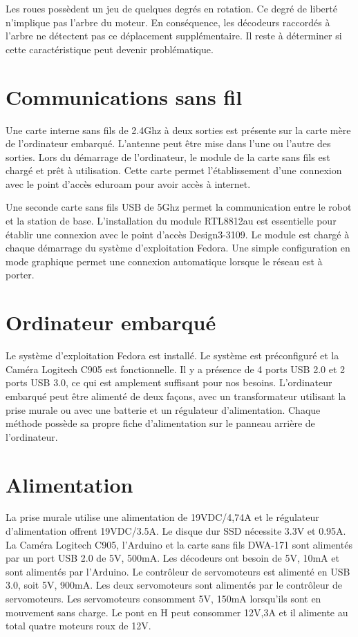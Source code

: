 Les roues possèdent un jeu de quelques degrés en rotation. Ce degré de liberté n’implique pas l’arbre du moteur. En conséquence, les décodeurs raccordés à l’arbre ne détectent pas ce déplacement supplémentaire. Il reste à déterminer si cette caractéristique peut devenir problématique. 


\section{Communications sans fil}
 Une carte interne sans fils de 2.4Ghz à deux sorties est présente sur la carte mère de l’ordinateur embarqué. L’antenne peut être mise dans l’une ou l’autre des sorties. Lors du démarrage de l’ordinateur, le module de la carte sans fils est chargé et prêt à utilisation. Cette carte permet l’établissement d’une connexion avec le point d’accès eduroam pour avoir accès à internet. 
 
 Une seconde carte sans fils USB de 5Ghz permet la communication entre le robot et la station de base. L’installation du module RTL8812au est essentielle pour établir une connexion avec le point d’accès Design3-3109. Le module est chargé à chaque démarrage du système d’exploitation Fedora. Une simple configuration en mode graphique permet une connexion automatique lorsque le réseau est à porter. 

\section{Ordinateur embarqué}
 Le système d’exploitation Fedora est installé. Le système est préconfiguré et la Caméra Logitech C905 est fonctionnelle.  Il y a présence de 4 ports USB 2.0 et 2 ports USB 3.0, ce qui est amplement suffisant pour nos besoins. L’ordinateur embarqué peut être alimenté de deux façons, avec un transformateur utilisant la prise murale ou avec une batterie et un régulateur d’alimentation. Chaque méthode possède sa propre fiche d’alimentation sur le panneau arrière de l’ordinateur. 


\section{Alimentation}
  La prise murale utilise une alimentation de 19VDC/4,74A et le régulateur d’alimentation offrent 19VDC/3.5A. Le disque dur SSD nécessite 3.3V et 0.95A. La Caméra Logitech C905, l’Arduino et la carte sans fils DWA-171 sont alimentés par un port USB 2.0 de 5V, 500mA. Les décodeurs ont besoin de 5V, 10mA et sont alimentés par l’Arduino. Le contrôleur de servomoteurs est alimenté en USB 3.0, soit 5V, 900mA. Les deux servomoteurs sont alimentés par le contrôleur de servomoteurs. Les servomoteurs consomment 5V, 150mA lorsqu’ils sont en mouvement sans charge. Le pont en H peut consommer 12V,3A et il alimente au total quatre moteurs roux de 12V.

